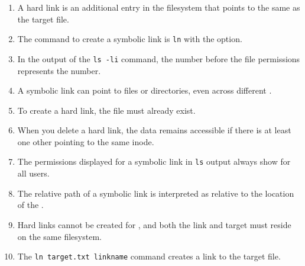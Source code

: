 \documentclass[a4paper]{report}
\begin{document}
\begin{enumerate}[1.]
    \item A hard link is an additional entry in the filesystem that points to the same \underline{\hspace{2cm}} as the target file.
    
    \item The command to create a symbolic link is \texttt{ln} with the \underline{\hspace{2cm}} option.
    
    \item In the output of the \texttt{ls -li} command, the number before the file permissions represents the \underline{\hspace{2cm}} number.
    
    \item A symbolic link can point to files or directories, even across different \underline{\hspace{2cm}}.
    
    \item To create a hard link, the \underline{\hspace{2cm}} file must already exist.
    
    \item When you delete a hard link, the data remains accessible if there is at least one other \underline{\hspace{2cm}} pointing to the same inode.
    
    \item The permissions displayed for a symbolic link in \texttt{ls} output always show \underline{\hspace{2cm}} for all users.
    
    \item The relative path of a symbolic link is interpreted as relative to the location of the \underline{\hspace{2cm}}.
    
    \item Hard links cannot be created for \underline{\hspace{2cm}}, and both the link and target must reside on the same filesystem.
    
    \item The \texttt{ln target.txt linkname} command creates a \underline{\hspace{2cm}} link to the target file.
    \end{enumerate}

\newpage
\end{document}
